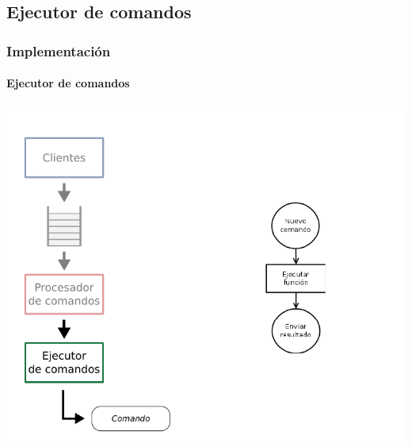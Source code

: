 \documentclass[xcolor=dvipsnames]{beamer}
\begin{document}
    \subsection{Ejecutor de comandos}
    \begin{frame}
        \frametitle{Implementación}
        \framesubtitle{Ejecutor de comandos}
        \begin{center}
            \includegraphics[height=0.99\textheight]{img/implementacion_executer.pdf}
        \end{center}
        
    \end{frame}
    
%         
    
\end{document}
